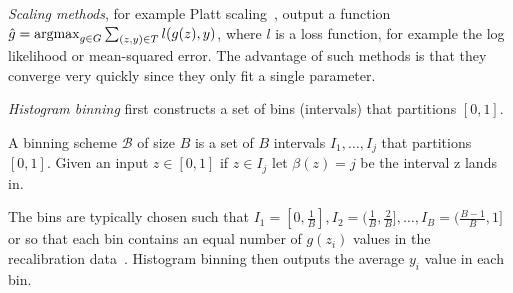 \emph{Scaling methods}, for example Platt scaling~\cite{platt1999probabilistic}, output a function $\hat{g} = \mathop{\mbox{argmax}}_{g \in G} \sum_{(z, y) \in T} l(g(z), y)$, where $l$ is a loss function, for example the log likelihood or mean-squared error. The advantage of such methods is that they converge very quickly since they only fit a single parameter.

\emph{Histogram binning} first constructs a set of bins (intervals) that partitions $[0, 1]$.

\begin{definition}
A binning scheme $\mathcal{B}$ of size $B$ is a set of $B$ intervals $I_1, \dots, I_j$ that partitions $[0, 1]$. Given an input $z \in [0, 1]$ if $z \in I_j$ let $\beta(z) = j$ be the interval z lands in.
\end{definition}

The bins are typically chosen such that $I_1 = [0, \frac{1}{B}], I_2 = (\frac{1}{B}, \frac{2}{B}], \dots, I_B = (\frac{B-1}{B}, 1]$ or so that each bin contains an equal number of $g(z_i)$ values in the recalibration data~\cite{zadrozny2001calibrated, guo2017calibration}. Histogram binning then outputs the average $y_i$ value in each bin.

